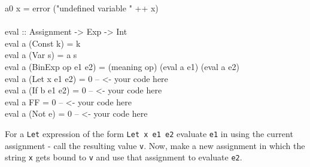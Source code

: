 \documentclass[11pt]{article}
\begin{document}
\begin{program*}
\> a0 x = error ("undefined variable " ++ x)  \\
\>   \\
\> eval :: Assignment -> Exp  -> Int  \\
\> eval a (Const k) = k  \\
\> eval a (Var s) = a s  \\
\> eval a (BinExp op e1 e2) = (meaning op) (eval a e1) (eval  a e2)  \\
\> eval a (Let x e1 e2) = 0 -- <- your code here  \\
\> eval a (If b e1 e2) = 0 -- <- your code here   \\
\> eval a FF = 0 -- <- your code here  \\
\> eval a (Not e) = 0 -- <- your code here  \\
\end{program*}

For a {\tt{Let}} expression of the form {\tt{Let x e1 e2}} evaluate {\tt{e1}}
in using the current assignment - call the resulting value {\tt{v}}. Now, make
a new assignment in which the string {\tt{x}} gets bound to {\tt{v}} and use
that assignment to evaluate {\tt{e2}}.


\end{document}
